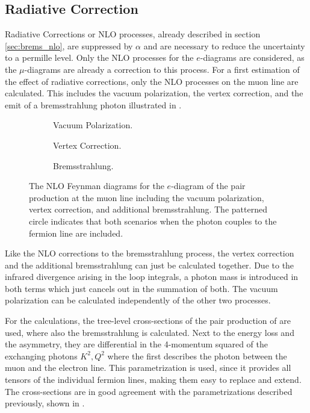 \subsection{Radiative Correction} \label{sec:epair_rad_corr}

Radiative Corrections or NLO processes, already described in section \ref{sec:brems_nlo}, are suppressed by $\alpha$ and are necessary to reduce the uncertainty to a permille level.
Only the NLO processes for the $e$-diagrams are considered, as the $\mu$-diagrams are already a correction to this process.
For a first estimation of the effect of radiative corrections, only the NLO processes on the muon line are calculated.
This includes the vacuum polarization, the vertex correction, and the emit of a bremsstrahlung photon illustrated in .
\begin{figure}
    \begin{subfigure}[t]{0.3\textwidth}
        \centering
        
        \caption{Vacuum Polarization.}
        \label{fig:feyn_epair_vac}
    \end{subfigure}
    \hfill
    \begin{subfigure}[t]{0.3\textwidth}
        \centering
        
        \caption{Vertex Correction.}
        \label{fig:feyn_epair_vertex}
    \end{subfigure}
    \hfill
    \begin{subfigure}[t]{0.3\textwidth}
        \centering
        
        \caption{Bremsstrahlung.}
        \label{fig:feyn_epair_brems}
    \end{subfigure}
    \caption{The NLO Feynman diagrams for the $e$-diagram of the pair production at the muon line including the vacuum polarization, vertex correction, and additional bremsstrahlung. The patterned circle indicates that both scenarios when the photon couples to the fermion line are included.}
    \label{fig:feyn_epair_nlo}
\end{figure}

Like the NLO corrections to the bremsstrahlung process, the vertex correction and the additional bremsstrahlung can just be calculated together.
Due to the infrared divergence arising in the loop integrals, a photon mass is introduced in both terms which just cancels out in the summation of both.
The vacuum polarization can be calculated independently of the other two processes.

For the calculations, the tree-level cross-sections of the pair production of \cite{Bugaev77} are used, where also the bremsstrahlung is calculated.
Next to the energy loss and the asymmetry, they are differential in the 4-momentum squared of the exchanging photons $K^2, Q^2$ where the first describes the photon between the muon and the electron line.
This parametrization is used, since it provides all tensors of the individual fermion lines, making them easy to replace and extend.
The cross-sections are in good agreement with the parametrizations described previously, shown in .

